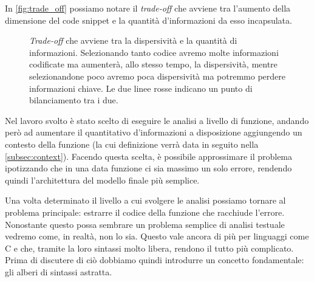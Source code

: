 In \autoref{fig:trade_off} possiamo notare il \textit{trade-off} che avviene tra l'aumento della dimensione del code snippet e la quantità d'informazioni da esso incapsulata. 

\begin{figure}[h]
  \centering
  \caption{\textit{Trade-off} che avviene tra la dispersività e la quantità di informazioni. Selezionando tanto codice avremo molte informazioni codificate ma aumenterà, allo stesso tempo, la dispersività, mentre selezionandone poco avremo poca dispersività ma potremmo perdere informazioni chiave.
    Le due linee rosse indicano un punto di bilanciamento tra i due.
  }
  \label{fig:trade_off}
\end{figure}

Nel lavoro svolto è stato scelto di eseguire le analisi a livello di funzione, andando però ad aumentare il quantitativo d'informazioni a disposizione aggiungendo un contesto della funzione (la cui definizione verrà data in seguito nella \autoref{subsec:context}). 
Facendo questa scelta, è possibile approssimare il problema ipotizzando che in una data funzione ci sia massimo un solo errore, rendendo quindi l'architettura del modello finale più semplice.



Una volta determinato il livello a cui svolgere le analisi possiamo tornare al problema principale: estrarre il codice della funzione che racchiude l'errore. 
Nonostante questo possa sembrare un problema semplice di analisi testuale vedremo come, in realtà, non lo sia.
Questo vale ancora di più per linguaggi come C e \CPP{} che, tramite la loro sintassi molto libera, rendono il tutto più complicato.
Prima di discutere di ciò dobbiamo quindi introdurre un concetto fondamentale: gli alberi di sintassi astratta.


